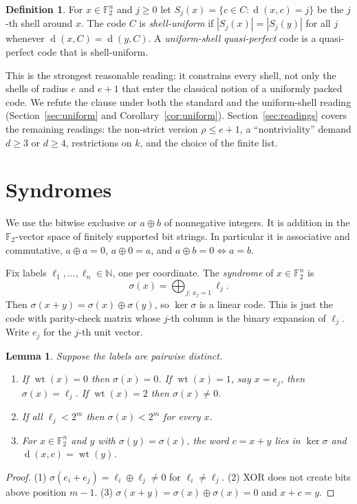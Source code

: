 \documentclass[11pt]{article}
\newtheorem{lemma}[theorem]{Lemma}
\theoremstyle{definition}
\newtheorem{definition}[theorem]{Definition}
\theoremstyle{remark}
\newcommand{\F}{\mathbb{F}_2}
\newcommand{\wt}{\operatorname{wt}}
\newcommand{\dd}{\operatorname{d}}
\begin{document}
\begin{definition}\label{def:uniform}
For $x\in\F^n$ and $j\ge 0$ let $S_j(x)=\{c\in C:\dd(x,c)=j\}$ be the
$j$-th shell around $x$. The code $C$ is \emph{shell-uniform} if
$|S_j(x)|=|S_j(y)|$ for all $j$ whenever $\dd(x,C)=\dd(y,C)$. A
\emph{uniform-shell quasi-perfect} code is a quasi-perfect code that is
shell-uniform.
\end{definition}

This is the strongest reasonable reading: it constrains every shell, not only
the shells of radius $e$ and $e+1$ that enter the classical notion of a
uniformly packed code. We refute the clause under both the standard and the
uniform-shell reading (Section~\ref{sec:uniform} and Corollary~\ref{cor:uniform}).
Section~\ref{sec:readings} covers the remaining readings: the non-strict
version $\rho\le e+1$, a ``nontriviality'' demand $d\ge 3$ or $d\ge 4$,
restrictions on $k$, and the choice of the finite list.

\section{Syndromes}
We use the bitwise exclusive or $a\oplus b$ of nonnegative integers. It is
addition in the $\F$-vector space of finitely supported bit strings. In
particular it is associative and commutative, $a\oplus a=0$, $a\oplus 0=a$, and
$a\oplus b=0\iff a=b$.

Fix labels $\ell_1,\dots,\ell_n\in\mathbb{N}$, one per coordinate. The
\emph{syndrome} of $x\in\F^n$ is
\[
\sigma(x)=\bigoplus_{j:\,x_j=1}\ell_j .
\]
Then $\sigma(x+y)=\sigma(x)\oplus\sigma(y)$, so $\ker\sigma$ is a linear code.
This is just the code with parity-check matrix whose $j$-th column is the
binary expansion of $\ell_j$. Write $e_j$ for the $j$-th unit vector.

\begin{lemma}\label{lem:syn}
Suppose the labels are pairwise distinct.
\begin{enumerate}
\item If $\wt(x)=0$ then $\sigma(x)=0$. If $\wt(x)=1$, say $x=e_j$, then
$\sigma(x)=\ell_j$. If $\wt(x)=2$ then $\sigma(x)\neq 0$.
\item If all $\ell_j<2^m$ then $\sigma(x)<2^m$ for every $x$.
\item For $x\in\F^n$ and $y$ with $\sigma(y)=\sigma(x)$, the word $c=x+y$ lies
in $\ker\sigma$ and $\dd(x,c)=\wt(y)$.
\end{enumerate}
\end{lemma}
\begin{proof}
(1) $\sigma(e_i+e_j)=\ell_i\oplus\ell_j\ne 0$ for $\ell_i\ne\ell_j$.
(2) XOR does not create bits above position $m-1$.
(3) $\sigma(x+y)=\sigma(x)\oplus\sigma(x)=0$ and $x+c=y$.
\end{proof}
\end{document}
